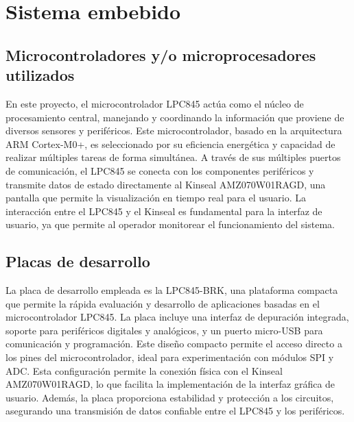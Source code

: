 \chapter{Sistema embebido}

\section{Microcontroladores y/o microprocesadores utilizados}
En este proyecto, el microcontrolador LPC845 actúa como el núcleo de procesamiento central, manejando y coordinando la información que proviene de diversos sensores y periféricos. Este microcontrolador, basado en la arquitectura ARM Cortex-M0+, es seleccionado por su eficiencia energética y capacidad de realizar múltiples tareas de forma simultánea. A través de sus múltiples puertos de comunicación, el LPC845 se conecta con los componentes periféricos y transmite datos de estado directamente al Kinseal AMZ070W01RAGD, una pantalla que permite la visualización en tiempo real para el usuario. La interacción entre el LPC845 y el Kinseal es fundamental para la interfaz de usuario, ya que permite al operador monitorear el funcionamiento del sistema.

\section{Placas de desarrollo}
La placa de desarrollo empleada es la LPC845-BRK, una plataforma compacta que permite la rápida evaluación y desarrollo de aplicaciones basadas en el microcontrolador LPC845. La placa incluye una interfaz de depuración integrada, soporte para periféricos digitales y analógicos, y un puerto micro-USB para comunicación y programación. Este diseño compacto permite el acceso directo a los pines del microcontrolador, ideal para experimentación con módulos SPI y ADC. Esta configuración permite la conexión física con el Kinseal AMZ070W01RAGD, lo que facilita la implementación de la interfaz gráfica de usuario. Además, la placa proporciona estabilidad y protección a los circuitos, asegurando una transmisión de datos confiable entre el LPC845 y los periféricos.

